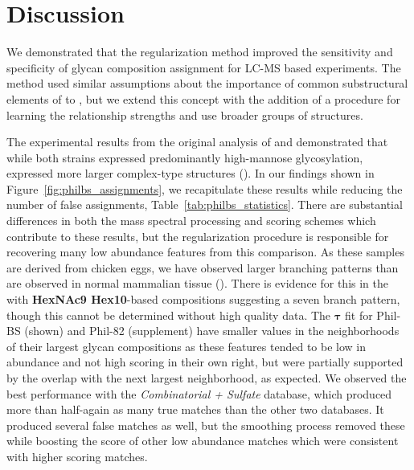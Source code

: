 \section{Discussion}

    We demonstrated that the regularization method improved the
    sensitivity and specificity of glycan composition assignment for
    LC-MS based experiments. The method used similar assumptions about
    the importance of common substructural elements of \nglycans to
    \cite{Goldberg2009}, but we extend this concept with the addition
    of a procedure for learning the relationship strengths and use
    broader groups of structures.

    The experimental results from the original analysis of \philbs and
     demonstrated that while both strains expressed predominantly
    high-mannose glycosylation, \philbs expressed more larger complex-type
    structures (\cite{Khatri2016a}). In our findings shown in Figure~\ref{fig:philbs_assignments},
    we recapitulate these results while reducing the number of false
    assignments, Table~\ref{tab:philbs_statistics}. There are substantial
    differences in both the mass spectral processing and scoring schemes which
    contribute to these results, but the regularization procedure is responsible
    for recovering many low abundance features from this comparison. As these
    samples are derived from chicken eggs, we have observed larger
    branching patterns than are observed in normal mammalian tissue (\cite{Stanley2009}).
    There is evidence for this in the \philbs with \textbf{HexNAc9 Hex10}-based compositions
    suggesting a seven branch pattern, though this cannot be determined without high quality
    \msn data. The $\mathbf{\tau}$ fit for Phil-BS (shown) and Phil-82 (supplement) have
    smaller values in the neighborhoods of their largest glycan compositions as
    these features tended to be low in abundance and not high scoring in their own
    right, but were partially supported by the overlap with the next largest neighborhood,
    as expected. We observed the best performance with the \textit{Combinatorial + Sulfate}
    database, which produced more than half-again as many true matches than the other two
    databases. It produced several false matches as well, but the smoothing process removed
    these while boosting the score of other low abundance matches which were consistent with
    higher scoring matches.

